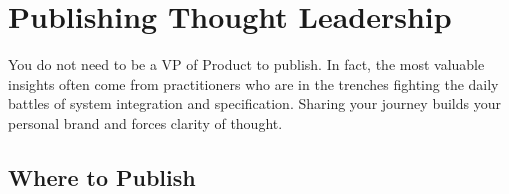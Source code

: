 \documentclass[
  11pt,
  openany,
  oneside]{book}
\begin{document}
\bigskip

\section{Publishing Thought
Leadership}\label{publishing-thought-leadership}

You do not need to be a VP of Product to publish. In fact, the most
valuable insights often come from practitioners who are in the trenches
fighting the daily battles of system integration and specification.
Sharing your journey builds your personal brand and forces clarity of
thought.

\subsection{Where to Publish}\label{where-to-publish}
\end{document}
